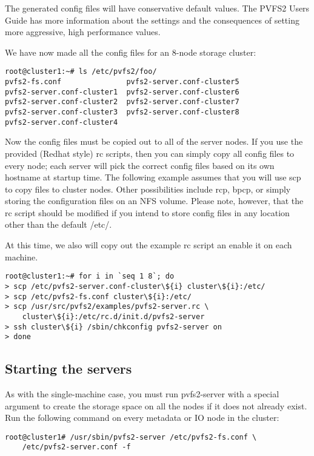 \documentclass[11pt, letterpaper]{article}
\begin{document}
The generated config files will have conservative default values.  The PVFS2
Users Guide has more information about the settings and the consequences of
setting more aggressive, high performance values.

We have now made all the config files for an 8-node storage cluster:
\begin{verbatim}
root@cluster1:~# ls /etc/pvfs2/foo/
pvfs2-fs.conf               pvfs2-server.conf-cluster5
pvfs2-server.conf-cluster1  pvfs2-server.conf-cluster6
pvfs2-server.conf-cluster2  pvfs2-server.conf-cluster7
pvfs2-server.conf-cluster3  pvfs2-server.conf-cluster8
pvfs2-server.conf-cluster4
\end{verbatim}

Now the config files must be copied out to all of the server nodes.  If you 
use the provided (Redhat style) rc scripts, then you can simply copy all
config files to every node; each server will pick the correct config files
based on its own hostname at startup time.  The following example assumes
that you will use scp to copy files to cluster nodes.  Other possibilities
include rcp, bpcp, or simply storing the configuration files on an NFS volume.
Please note, however, that the rc script should be modified if you intend
to store config files in any location other than the default /etc/.

At this time, we also will copy out the example rc script an enable it on
each machine.

\begin{verbatim}
root@cluster1:~# for i in `seq 1 8`; do
> scp /etc/pvfs2-server.conf-cluster\${i} cluster\${i}:/etc/
> scp /etc/pvfs2-fs.conf cluster\${i}:/etc/
> scp /usr/src/pvfs2/examples/pvfs2-server.rc \
    cluster\${i}:/etc/rc.d/init.d/pvfs2-server
> ssh cluster\${i} /sbin/chkconfig pvfs2-server on
> done
\end{verbatim}

\subsection{Starting the servers}

As with the single-machine case, you must run pvfs2-server with a
special argument to create the storage space on all the nodes if it
does not already exist.  Run the following command on every metadata
or IO node in the cluster:

\begin{verbatim}
root@cluster1# /usr/sbin/pvfs2-server /etc/pvfs2-fs.conf \
	/etc/pvfs2-server.conf -f
\end{verbatim}
\end{document}
